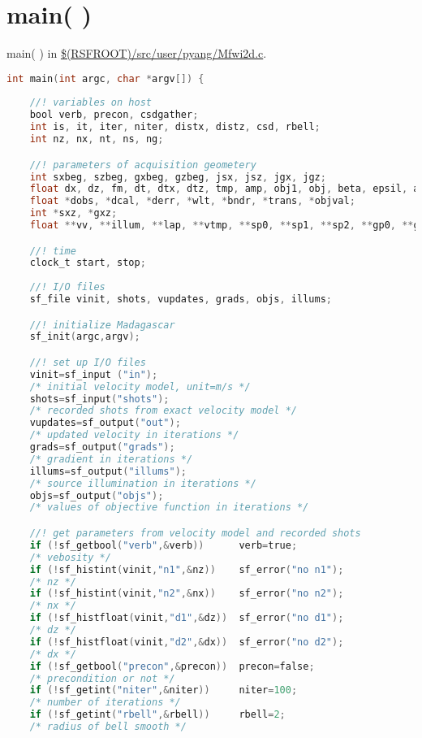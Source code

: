 \documentclass[a4paper,11pt]{article}
\theoremstyle{mytheor}
\begin{document}
\section*{main( )}
main( ) in \url{$(RSFROOT)/src/user/pyang/Mfwi2d.c}.
\begin{lstlisting}[label={main},language=C,tabsize=4,caption=main()]
int main(int argc, char *argv[]) {
	
	//! variables on host 
	bool verb, precon, csdgather;
	int is, it, iter, niter, distx, distz, csd, rbell;
	int nz, nx, nt, ns, ng;

	//! parameters of acquisition geometery 
	int sxbeg, szbeg, gxbeg, gzbeg, jsx, jsz, jgx, jgz;
	float dx, dz, fm, dt, dtx, dtz, tmp, amp, obj1, obj, beta, epsil, alpha;
	float *dobs, *dcal, *derr, *wlt, *bndr, *trans, *objval;
	int *sxz, *gxz;		
	float **vv, **illum, **lap, **vtmp, **sp0, **sp1, **sp2, **gp0, **gp1, **gp2, **g0, **g1, **cg, *alpha1, *alpha2, **ptr=NULL;	

    //! time
	clock_t start, stop;
	
	//! I/O files
	sf_file vinit, shots, vupdates, grads, objs, illums;

	//! initialize Madagascar
	sf_init(argc,argv);

	//! set up I/O files 
	vinit=sf_input ("in");   	
	/* initial velocity model, unit=m/s */
	shots=sf_input("shots"); 	
	/* recorded shots from exact velocity model */
	vupdates=sf_output("out"); 	
	/* updated velocity in iterations */ 
	grads=sf_output("grads");  	
	/* gradient in iterations */ 
	illums=sf_output("illums");	
	/* source illumination in iterations */
	objs=sf_output("objs");		
	/* values of objective function in iterations */

	//! get parameters from velocity model and recorded shots 
	if (!sf_getbool("verb",&verb)) 		verb=true;			
	/* vebosity */
	if (!sf_histint(vinit,"n1",&nz)) 	sf_error("no n1");	
	/* nz */
	if (!sf_histint(vinit,"n2",&nx)) 	sf_error("no n2");	
	/* nx */
	if (!sf_histfloat(vinit,"d1",&dz)) 	sf_error("no d1");	
	/* dz */
	if (!sf_histfloat(vinit,"d2",&dx)) 	sf_error("no d2");	
	/* dx */
	if (!sf_getbool("precon",&precon)) 	precon=false;	
	/* precondition or not */
	if (!sf_getint("niter",&niter))   	niter=100;		
	/* number of iterations */
	if (!sf_getint("rbell",&rbell))	  	rbell=2;		
	/* radius of bell smooth */


\end{lstlisting}
\end{document}
